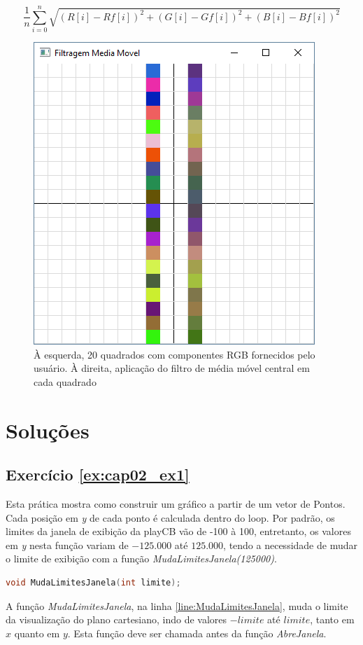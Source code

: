 \begin{enumerate}
  \begin{equation} \label{eq:distancia}
  \frac{1}{n}\sum_{i = 0}^{n}\sqrt{(R[i] - Rf[i])^{2} + (G[i] - Gf[i])^{2} + (B[i] - Bf[i])^{2}}
\end{equation}

\begin{figure}[ht]
    \centerline{\includegraphics[width=.5\textwidth]{img/cap2_ex26.png}}
    \caption{À esquerda, 20 quadrados com componentes RGB fornecidos pelo usuário. À direita, aplicação do filtro de média móvel central em cada quadrado}
    \label{fig:cap02_ex26}
  \end{figure}


\end{enumerate}

\section*{Soluções}

\subsection*{Exercício \ref{ex:cap02_ex1}}

Esta prática mostra como construir um gráfico a partir de um vetor de Pontos. Cada posição em \emph{y} de cada ponto é calculada dentro do loop. Por padrão, os limites da janela de exibição da playCB vão de -100 à 100, entretanto, os valores em \emph{y} nesta função variam de $-125.000$ até $125.000$, tendo a necessidade de mudar o limite de exibição com a função \emph{MudaLimitesJanela(125000)}.


\begin{lstlisting}[label={func:MudaLimitesJanela},language=C++]
void MudaLimitesJanela(int limite);
\end{lstlisting}
A função \emph{MudaLimitesJanela}, na linha \ref{line:MudaLimitesJanela}, muda o limite da visualização do plano cartesiano, indo de valores $-limite$ até $limite$, tanto em $x$ quanto em $y$. Esta função deve ser chamada antes da função \emph{AbreJanela}.

